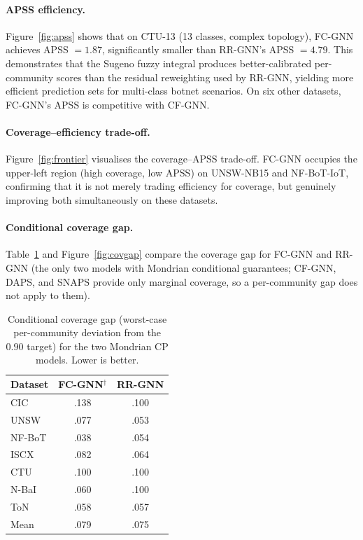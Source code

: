 \paragraph{APSS efficiency.}
Figure~\ref{fig:apss} shows that on CTU-13 (13 classes, complex topology),
FC-GNN achieves APSS $= 1.87$, significantly smaller than RR-GNN's
APSS $= 4.79$.
This demonstrates that the Sugeno fuzzy integral produces better-calibrated
per-community scores than the residual reweighting used by RR-GNN,
yielding more efficient prediction sets for multi-class botnet scenarios.
On six other datasets, FC-GNN's APSS is competitive with CF-GNN.

\paragraph{Coverage–efficiency trade-off.}
Figure~\ref{fig:frontier} visualises the coverage–APSS trade-off.
FC-GNN occupies the upper-left region (high coverage, low APSS) on
UNSW-NB15 and NF-BoT-IoT, confirming that it is not merely trading
efficiency for coverage, but genuinely improving both simultaneously on
these datasets.

\paragraph{Conditional coverage gap.}
Table~\ref{tab:cp_gap} and Figure~\ref{fig:covgap} compare the coverage gap
for FC-GNN and RR-GNN (the only two models with Mondrian conditional
guarantees; CF-GNN, DAPS, and SNAPS provide only marginal coverage, so a
per-community gap does not apply to them).

\begin{table}[t]
\caption{Conditional coverage gap (worst-case per-community deviation from
         the $0.90$ target) for the two Mondrian CP models. Lower is better.}
\label{tab:cp_gap}
\centering
\small
\begin{tabular}{lcc}
\toprule
Dataset & FC-GNN$^\dagger$ & RR-GNN \\
\midrule
CIC    & .138 & .100 \\
UNSW   & .077 & .053 \\
NF-BoT & .038 & .054 \\
ISCX   & .082 & .064 \\
CTU    & .100 & .100 \\
N-BaI  & .060 & .100 \\
ToN    & .058 & .057 \\
\midrule
Mean   & .079 & .075 \\
\bottomrule
\end{tabular}
\end{table}

